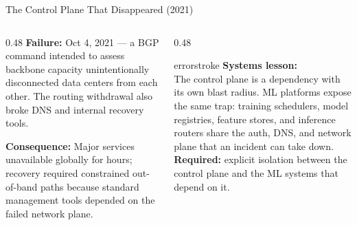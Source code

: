 \documentclass[aspectratio=169, 12pt]{beamer}
\begin{document}
\begin{frame}{The Control Plane That Disappeared (2021)}
\begin{columns}[T]
\begin{column}{0.48\textwidth}
    \vspace{0.15cm}
    \textbf{Failure:} Oct 4, 2021 --- a BGP command intended to assess
    backbone capacity unintentionally disconnected data centers from each
    other. The routing withdrawal also broke DNS and internal recovery tools.

    \vspace{0.15cm}
    \textbf{Consequence:} Major services unavailable globally for hours;
    recovery required constrained out-of-band paths because standard
    management tools depended on the failed network plane.
  \end{column}
  \begin{column}{0.48\textwidth}
    \begin{mlsyscard}{errorstroke}
    {\footnotesize\textbf{Systems lesson:}\\[0.1cm]
    The control plane is a dependency with its own blast radius. ML
    platforms expose the same trap: training schedulers, model registries,
    feature stores, and inference routers share the auth, DNS, and network
    plane that an incident can take down.\\[0.1cm]
    \textbf{Required:} explicit isolation between the control plane and
    the ML systems that depend on it.}
    \end{mlsyscard}
  \end{column}
\end{columns}

\end{frame}
\end{document}
